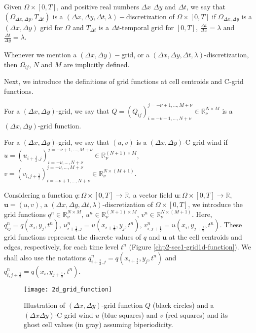 \begin{definition}
	\label{chp2-def-dxdytimegrid}
	Given $\Omega \times [0,T]$,
	and positive real numbers $\Delta x$ $\Delta y$ and $\Delta t$, we say that
	$(\Omega_{\Delta x, \Delta y}, {T}_{\Delta t})$
	is a $(\Delta x,\Delta y,\Delta t, \lambda)-$discretization of $\Omega \times [0,T]$ if
	$\Omega_{\Delta x, \Delta y}$ is a $(\Delta x,\Delta y)$
	grid for $\Omega$ and ${T}_{\Delta t}$ is a $\Delta t$-temporal
	grid for $[0,T]$, $\frac{\Delta t}{\Delta x} = \lambda$
	and  $\frac{\Delta t}{\Delta y} = \lambda$.
\end{definition}
\begin{remark}
	Whenever we mention a $(\Delta x,\Delta y)-$grid, or a $(\Delta x,\Delta y,\Delta t, \lambda)$-discretization,
	then $\Omega_{ij}$, $N$ and $M$ are implicitly defined.
\end{remark}
Next, we introduce the definitions of grid functions at cell centroids and C-grid functions. 
\begin{definition}
	\label{chp2-rmk-2d-gridfunction1}
	For a $(\Delta x,\Delta y)$-grid, we say that $Q = (Q_{ij})_{i=-\nu+1,\ldots,N+\nu}^{j=-\nu+1,\ldots,M+\nu} \in \mathbb{R}^{N\times M}_{\nu}$ is a 
	$(\Delta x,\Delta y)$-grid function.
\end{definition}
\begin{definition}
	\label{chp2-rmk-2d-gridfunction2}
	For a $(\Delta x,\Delta y)$-grid, we say that $(u,v)$ is a $(\Delta x,\Delta y)$-C grid wind if 
	$u = (u_{i+\frac{1}{2},j})_{i=-\nu,\ldots,N+\nu}^{j=-\nu+1,\ldots,M+\nu} \in \mathbb{R}^{(N+1) \times M}_{\nu}$, 
    $v = (v_{i,j+\frac{1}{2}})_{i=-\nu+1,\ldots,N+\nu}^{j=-\nu,\ldots,M+\nu} \in \mathbb{R}^{N \times (M+1)}_{\nu}$.
\end{definition}
Considering a function $q:\Omega\times[0,T] \to \mathbb{R}$,
a vector field $\boldsymbol{u}:\Omega\times[0,T] \to \mathbb{R}$, $\boldsymbol{u}=(u,v)$,
a $(\Delta x,\Delta y, \Delta t, \lambda)$-discretization
of $\Omega\times[0,T]$, we introduce the grid functions $q^n \in \mathbb{R}^{N\times M}_{\nu}$,
$u^n \in \mathbb{R}^{(N+1)\times M}_{\nu}$, $v^n \in \mathbb{R}^{N\times (M+1)}_{\nu}$. 
Here, ${q}^n_{ij} = {q}(x_i, y_j,t^{n})$, $u^n_{i+\frac{1}{2},j} = u(x_{i+\frac{1}{2}},y_j, t^n)$,
$v^n_{i,j+\frac{1}{2}} = u(x_i,y_{j+\frac{1}{2}}, t^n)$.
These grid functions represent the discrete values of $q$ and $\boldsymbol{u}$
at the cell centroids and edges, respectively,
for each time level $t^n$ (Figure \ref{chp2-sec1-grid1d-function}).
We shall also use the notations $q^n_{i+\frac{1}{2},j} = q(x_{i+\frac{1}{2}},y_j, t^n)$
and $q^n_{i,j+\frac{1}{2}} = q(x_i,y_{j+\frac{1}{2}}, t^n)$.
\begin{figure}[!htb]
	\centering
	\texttt{[image: 2d\_grid\_function]}
	\caption{Illustration of $(\Delta x, \Delta y)$-grid function $Q$ (black circles)
		and a $(\Delta x\Delta y)$-C grid wind $u$ (blue squares) and $v$ (red squares) and its ghost cell
		values (in gray) assuming biperiodicity.\label{chp3-sec1-grid2d-function}}
\end{figure}

